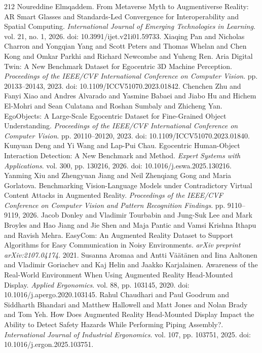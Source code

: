 \begin{thebibliography}{212}
 Noureddine Elmqaddem. From Metaverse Myth to Augmentiverse Reality: {AR} Smart Glasses and Standards-Led Convergence for Interoperability and Spatial Computing. \emph{International Journal of Emerging Technologies in Learning}. vol. 21, no. 1, 2026. doi: 10.3991/ijet.v21i01.59733.
 Xiaqing Pan and Nicholas Charron and Yongqian Yang and Scott Peters and Thomas Whelan and Chen Kong and Omkar Parkhi and Richard Newcombe and Yuheng Ren. Aria Digital Twin: A New Benchmark Dataset for Egocentric 3D Machine Perception. \emph{Proceedings of the IEEE/CVF International Conference on Computer Vision}. pp. 20133--20143, 2023. doi: 10.1109/ICCV51070.2023.01842.
 Chenchen Zhu and Fanyi Xiao and Andres Alvarado and Yasmine Babaei and Jiabo Hu and Hichem El-Mohri and Sean Culatana and Roshan Sumbaly and Zhicheng Yan. EgoObjects: A Large-Scale Egocentric Dataset for Fine-Grained Object Understanding. \emph{Proceedings of the IEEE/CVF International Conference on Computer Vision}. pp. 20110--20120, 2023. doi: 10.1109/ICCV51070.2023.01840.
 Kunyuan Deng and Yi Wang and Lap-Pui Chau. Egocentric Human-Object Interaction Detection: A New Benchmark and Method. \emph{Expert Systems with Applications}. vol. 300, pp. 130216, 2026. doi: 10.1016/j.eswa.2025.130216.
 Yanming Xiu and Zhengyuan Jiang and Neil Zhenqiang Gong and Maria Gorlatova. Benchmarking Vision-Language Models under Contradictory Virtual Content Attacks in Augmented Reality. \emph{Proceedings of the IEEE/CVF Conference on Computer Vision and Pattern Recognition Findings}. pp. 9110--9119, 2026.
 Jacob Donley and Vladimir Tourbabin and Jung-Suk Lee and Mark Broyles and Hao Jiang and Jie Shen and Maja Pantic and Vamsi Krishna Ithapu and Ravish Mehra. {EasyCom}: An Augmented Reality Dataset to Support Algorithms for Easy Communication in Noisy Environments. \emph{arXiv preprint arXiv:2107.04174}. 2021.
 Susanna Aromaa and Antti V{\"a}{\"a}t{\"a}nen and Iina Aaltonen and Vladimir Goriachev and Kaj Helin and Jaakko Karjalainen. Awareness of the Real-World Environment When Using Augmented Reality Head-Mounted Display. \emph{Applied Ergonomics}. vol. 88, pp. 103145, 2020. doi: 10.1016/j.apergo.2020.103145.
 Rahul Chaudhari and Paul Goodrum and Siddharth Bhandari and Matthew Hallowell and Matt Jones and Nolan Brady and Tom Yeh. How Does Augmented Reality Head-Mounted Display Impact the Ability to Detect Safety Hazards While Performing Piping Assembly?. \emph{International Journal of Industrial Ergonomics}. vol. 107, pp. 103751, 2025. doi: 10.1016/j.ergon.2025.103751.

\end{thebibliography}
